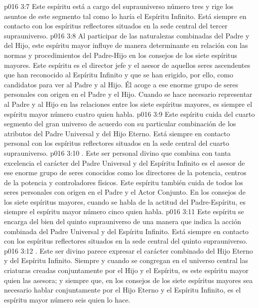 \vs p016 3:7 Este espíritu está a cargo del suprauniverso número tres y rige los asuntos de este segmento tal como lo haría el Espíritu Infinito. Está siempre en contacto con los espíritus reflectores situados en la sede central del tercer suprauniverso.
\vs p016 3:8 \pc {} Al participar de las naturalezas combinadas del Padre y del Hijo, este espíritu mayor influye de manera determinante en relación con las normas y procedimientos del Padre\hyp{}Hijo en los consejos de los siete espíritus mayores. Este espíritu es el director jefe y el asesor de aquellos seres ascendentes que han reconocido al Espíritu Infinito y que se han erigido, por ello, como candidatos para ver al Padre y al Hijo. Él acoge a ese enorme grupo de seres personales con origen en el Padre y el Hijo. Cuando se hace necesario representar al Padre y al Hijo en las relaciones entre los siete espíritus mayores, es siempre el espíritu mayor número cuatro quien habla.
\vs p016 3:9 Este espíritu cuida del cuarto segmento del gran universo de acuerdo con su particular combinación de los atributos del Padre Universal y del Hijo Eterno. Está siempre en contacto personal con los espíritus reflectores situados en la sede central del cuarto suprauniverso.
\vs p016 3:10 \pc {}. Este ser personal divino que combina con tanta excelencia el carácter del Padre Universal y del Espíritu Infinito es el asesor de ese enorme grupo de seres conocidos como los directores de la potencia, centros de la potencia y controladores físicos. Este espíritu también cuida de todos los seres personales con origen en el Padre y el Actor Conjunto. En los consejos de los siete espíritus mayores, cuando se habla de la actitud del Padre\hyp{}Espíritu, es siempre el espíritu mayor número cinco quien habla.
\vs p016 3:11 Este espíritu se encarga del bien del quinto suprauniverso de una manera que indica la acción combinada del Padre Universal y del Espíritu Infinito. Está siempre en contacto con los espíritus reflectores situados en la sede central del quinto suprauniverso.
\vs p016 3:12 \pc {}. Este ser divino parece expresar el carácter combinado del Hijo Eterno y del Espíritu Infinito. Siempre y cuando se congregan en el universo central las criaturas creadas conjuntamente por el Hijo y el Espíritu, es este espíritu mayor quien las asesora; y siempre que, en los consejos de los siete espíritus mayores sea necesario hablar conjuntamente por el Hijo Eterno y el Espíritu Infinito, es el espíritu mayor número seis quien lo hace.
